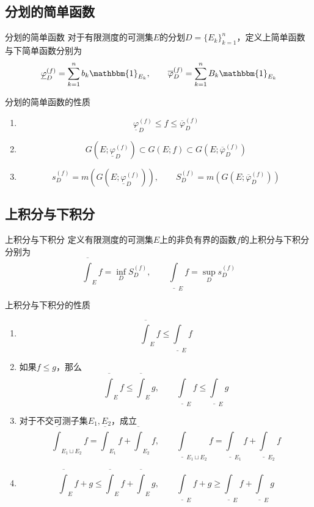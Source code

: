 \documentclass[lang = cn, scheme = chinese, thmcnt = section]{elegantbook}
\newcommand{\sub}{\subset}             %
\begin{document}
\subsection{分划的简单函数}

\begin{definition}{分划的简单函数}
	对于有限测度的可测集$E$的分划$D=\{E_k\}_{k=1}^{n}$，定义上简单函数与下简单函数分别为
	$$
	\underline{\varphi}_D^{(f)}=\sum_{k=1}^{n}b_k\mathbbm{1}_{E_k},\qquad 
	\overline{\varphi}_D^{(f)}=\sum_{k=1}^{n}B_k\mathbbm{1}_{E_k}
	$$
\end{definition}

\begin{proposition}{分划的简单函数的性质}
	\begin{enumerate}
		\item 
		$$
		\underline{\varphi}_D^{(f)}\le f\le\overline{\varphi}_D^{(f)}
		$$
		\item 
		$$
		G(E;\underline{\varphi}_D^{(f)})\sub
		G(E;f)\sub
		G(E;\overline{\varphi}_D^{(f)})
		$$
		\item 
		$$
		s_D^{(f)}=m(G(E;\underline{\varphi}_D^{(f)})),\qquad
		S_D^{(f)}=m(G(E;\overline{\varphi}_D^{(f)}))
		$$
	\end{enumerate}
\end{proposition}

\subsection{上积分与下积分}

\begin{definition}{上积分与下积分}
	定义有限测度的可测集$E$上的非负有界的函数$f$的上积分与下积分分别为
	$$
	\overline{\int}_{E}f=\inf_{D}S_D^{(f)},\qquad
	\underline{\int}_{E}f=\sup_{D}s_D^{(f)}
	$$
\end{definition}

\begin{proposition}{上积分与下积分的性质}
	\begin{enumerate}
		\item 
		$$
		\overline{\int}_{E}f\le\underline{\int}_{E}f
		$$
		\item 如果$f\le g$​，那么
		$$
		\overline{\int}_{E}f\le
		\overline{\int}_{E}g,\qquad 
		\underline{\int}_{E}f\le
		\underline{\int}_{E}g
		$$
		\item 对于不交可测子集$E_1,E_2$，成立
		$$
		\overline{\int}_{E_1\sqcup E_2}f=\overline{\int}_{E_1}f+\overline{\int}_{E_2}f
		,\qquad
		\underline{\int}_{E_1\sqcup E_2}f=\underline{\int}_{E_1}f+\underline{\int}_{E_2}f
		$$
		\item 
		$$
		\overline{\int}_{E}f+g\le \overline{\int}_{E}f+\overline{\int}_{E}g
		,\qquad
		\underline{\int}_{E}f+g\ge\underline{\int}_{E}f+\underline{\int}_{E}g
		$$
	\end{enumerate}
\end{proposition}
\end{document}
